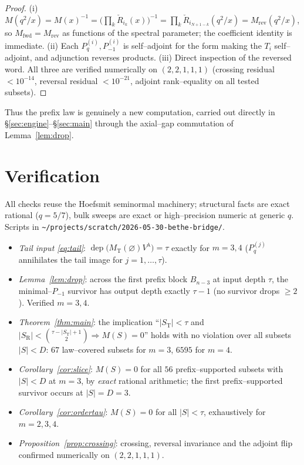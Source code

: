 \documentclass[11pt]{article}
\theoremstyle{definition}
\DeclareMathOperator{\dep}{dep}
\newcommand{\Vlam}{V^\lambda}
\newcommand{\Pq}{P_{q}}
\newcommand{\Pm}{P_{-1}}
\newcommand{\St}{S_{\mathrm T}}
\newcommand{\Sr}{S_{\mathrm R}}
\begin{document}
\begin{proof}
(i) $M(q^2/x)=M(x)^{-1}=\big(\prod_k\check R_{i_k}(x)\big)^{-1}=\prod_k\check
R_{i_{N+1-k}}(q^2/x)=M_{\mathrm{rev}}(q^2/x)$, so $M_{\mathrm{fwd}}=M_{\mathrm{rev}}$ as
functions of the spectral parameter; the coefficient identity is immediate. (ii) Each
$\Pq^{(i)},\Pm^{(i)}$ is self--adjoint for the form making the $T_i$ self--adjoint, and adjunction
reverses products. (iii) Direct inspection of the reversed word. All three are verified
numerically on $(2,2,1,1,1)$ (crossing residual $<10^{-14}$, reversal residual $<10^{-21}$,
adjoint rank--equality on all tested subsets).
\end{proof}

Thus the prefix law is genuinely a new computation, carried out directly in
\S\ref{sec:engine}--\S\ref{sec:main} through the axial--gap commutation of Lemma~\ref{lem:drop}.

\section{Verification}\label{sec:verify}

All checks reuse the Hoefsmit seminormal machinery; structural facts are exact rational
($q=5/7$), bulk sweeps are exact or high--precision numeric at generic $q$. Scripts in
\texttt{\~{}/projects/scratch/2026-05-30-bethe-bridge/}.

\begin{itemize}[topsep=0.2em,itemsep=0.1em]
\item \emph{Tail input \eqref{eq:tail}}: $\dep\big(M_{\mathrm T}(\varnothing)\Vlam\big)=\tau$
exactly for $m=3,4$ ($\Pq^{(j)}$ annihilates the tail image for $j=1,\dots,\tau$).
\item \emph{Lemma~\ref{lem:drop}}: across the first prefix block $B_{n-3}$ at input depth
$\tau$, the minimal--$\Pm$ survivor has output depth exactly $\tau-1$ (no survivor drops $\ge2$).
Verified $m=3,4$.
\item \emph{Theorem~\ref{thm:main}}: the implication
``$|\St|<\tau$ and $|\Sr|<\binom{\tau-|\St|+1}2\Rightarrow M(S)=0$'' holds with no violation
over all subsets $|S|<D$: $67$ law--covered subsets for $m=3$, $6595$ for $m=4$.
\item \emph{Corollary~\ref{cor:slice}}: $M(S)=0$ for all $56$ prefix--supported subsets with
$|S|<D$ at $m=3$, by \emph{exact} rational arithmetic; the first prefix--supported survivor
occurs at $|S|=D=3$.
\item \emph{Corollary~\ref{cor:ordertau}}: $M(S)=0$ for all $|S|<\tau$, exhaustively for
$m=2,3,4$.
\item \emph{Proposition~\ref{prop:crossing}}: crossing, reversal invariance and the adjoint flip
confirmed numerically on $(2,2,1,1,1)$.
\end{itemize}
\end{document}
